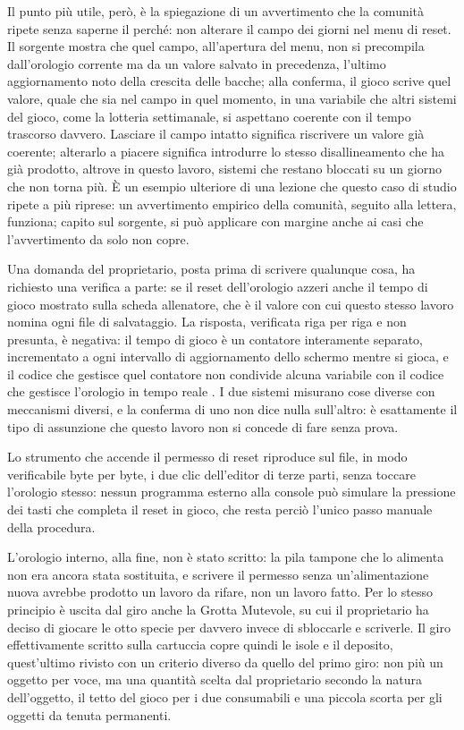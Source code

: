 Il punto più utile, però, è la spiegazione di un avvertimento che la comunità ripete senza saperne il perché: non alterare il campo dei giorni nel menu di reset. Il sorgente mostra che quel campo, all'apertura del menu, non si precompila dall'orologio corrente ma da un valore salvato in precedenza, l'ultimo aggiornamento noto della crescita delle bacche; alla conferma, il gioco scrive quel valore, quale che sia nel campo in quel momento, in una variabile che altri sistemi del gioco, come la lotteria settimanale, si aspettano coerente con il tempo trascorso davvero. Lasciare il campo intatto significa riscrivere un valore già coerente; alterarlo a piacere significa introdurre lo stesso disallineamento che ha già prodotto, altrove in questo lavoro, sistemi che restano bloccati su un giorno che non torna più. È un esempio ulteriore di una lezione che questo caso di studio ripete a più riprese: un avvertimento empirico della comunità, seguito alla lettera, funziona; capito sul sorgente, si può applicare con margine anche ai casi che l'avvertimento da solo non copre.

Una domanda del proprietario, posta prima di scrivere qualunque cosa, ha richiesto una verifica a parte: se il reset dell'orologio azzeri anche il tempo di gioco mostrato sulla scheda allenatore, che è il valore con cui questo stesso lavoro nomina ogni file di salvataggio. La risposta, verificata riga per riga e non presunta, è negativa: il tempo di gioco è un contatore interamente separato, incrementato a ogni intervallo di aggiornamento dello schermo mentre si gioca, e il codice che gestisce quel contatore non condivide alcuna variabile con il codice che gestisce l'orologio in tempo reale \cite{pokeemerald}. I due sistemi misurano cose diverse con meccanismi diversi, e la conferma di uno non dice nulla sull'altro: è esattamente il tipo di assunzione che questo lavoro non si concede di fare senza prova.

Lo strumento che accende il permesso di reset riproduce sul file, in modo verificabile byte per byte, i due clic dell'editor di terze parti, senza toccare l'orologio stesso: nessun programma esterno alla console può simulare la pressione dei tasti che completa il reset in gioco, che resta perciò l'unico passo manuale della procedura.

L'orologio interno, alla fine, non è stato scritto: la pila tampone che lo alimenta non era ancora stata sostituita, e scrivere il permesso senza un'alimentazione nuova avrebbe prodotto un lavoro da rifare, non un lavoro fatto. Per lo stesso principio è uscita dal giro anche la Grotta Mutevole, su cui il proprietario ha deciso di giocare le otto specie per davvero invece di sbloccarle e scriverle. Il giro effettivamente scritto sulla cartuccia copre quindi le isole e il deposito, quest'ultimo rivisto con un criterio diverso da quello del primo giro: non più un oggetto per voce, ma una quantità scelta dal proprietario secondo la natura dell'oggetto, il tetto del gioco per i due consumabili e una piccola scorta per gli oggetti da tenuta permanenti.

